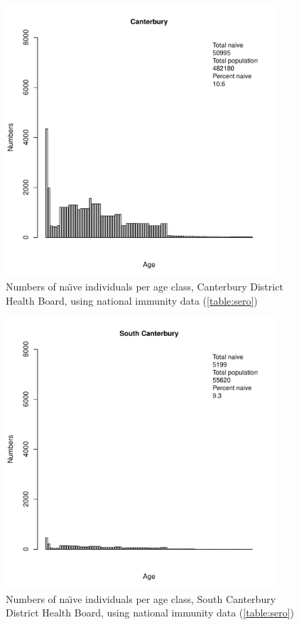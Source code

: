\documentclass{article}
\begin{document}
\begin{figure}[H]
   \begin{center}
     \includegraphics[width=0.9\textwidth]{dhb18.pdf}
     \end{center}
     \caption{Numbers of na\"{\i}ve individuals per age class, Canterbury District Health Board, using national immunity data (\autoref{table:sero})}
     \label{fig:Canterbury}
     \end{figure}

\begin{figure}[H]
     \begin{center}
     \includegraphics[width=0.9\textwidth]{dhb19.pdf}
     \end{center}
     \caption{Numbers of na\"{\i}ve individuals per age class, South Canterbury District Health Board, using national immunity data (\autoref{table:sero})}
     \label{fig:SouthCanterbury}
\end{figure}
\end{document}
